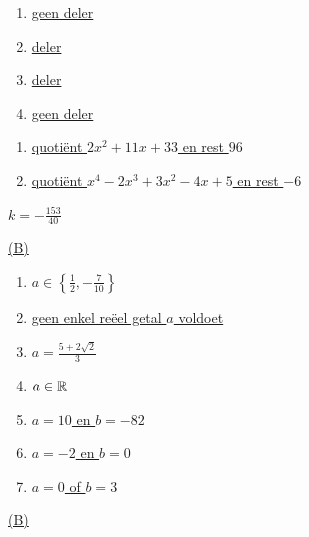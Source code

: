 \documentclass{ximera}
\begin{document}
\begin{Antwoord} \label{antw3.3}
\begin{enumerate}
\item
\hyperlink{oef3.3}{geen deler}
\item
\hyperlink{oef3.3}{deler}
\item
\hyperlink{oef3.3}{deler}
\item
\hyperlink{oef3.3}{geen deler}
\end{enumerate}
\end{Antwoord}

\begin{Antwoord} \label{antw3.4}
\begin{enumerate}
\item
\hyperlink{oef3.4}{quoti\"ent $2x^2+11x+33$ en rest $96$}
\item
\hyperlink{oef3.4}{quoti\"ent $x^4-2x^3+3x^2-4x+5$ en rest $-6$}
\end{enumerate}
\end{Antwoord}

\begin{Antwoord} \label{antw3.5}
\hyperlink{oef3.5}{$k = - \frac{153}{40}$}
\end{Antwoord}

\begin{Antwoord} \label{antw3.6}
\hyperlink{oef3.6}{(B)}
\end{Antwoord}

\begin{Antwoord} \label{antw3.7}
\begin{enumerate}
\item
\hyperlink{oef3.7}{$a \in \left\{\frac{1}{2}, -\frac{7}{10}\right\}$}
\item
\hyperlink{oef3.7}{geen enkel re\"eel getal $a$ voldoet}
\item
\hyperlink{oef3.7}{$a = \frac{5+2\sqrt{2}}{3}$}
\item
\hyperlink{oef3.7}{$a \in \mathbb{R}$}
\item
\hyperlink{oef3.7}{$a = 10$ en $b = -82$}
\item
\hyperlink{oef3.7}{$a = -2$ en $b = 0$}
\item
\hyperlink{oef3.7}{$a = 0$ of $b = 3$}
\end{enumerate}
\end{Antwoord}

\begin{Antwoord} \label{antw3.8}
\hyperlink{oef3.8}{(B)}
\end{Antwoord}
\end{document}
